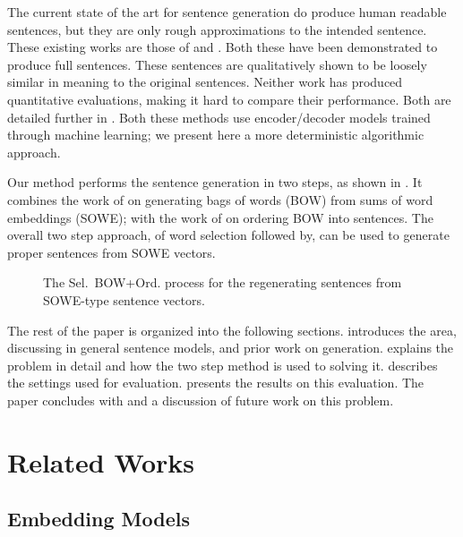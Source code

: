 \documentclass[compsoc]{IEEEtran}
\theoremstyle{plain}
\theoremstyle{definition}
\newcommand{\twosteptitle}{Sel.~BOW+Ord.}
\begin{document}
The current state of the art for sentence generation do produce human readable sentences, but they are only rough approximations to the intended sentence. These existing works are those of  \textcite{iyyer2014generating} and \textcite{Bowman2015SmoothGeneration}. Both these have been demonstrated to produce full sentences. These sentences are qualitatively shown to be loosely similar in meaning to the original sentences. Neither work has produced quantitative evaluations, making it hard to compare their performance. Both are detailed further in . Both these methods use encoder/decoder models trained through machine learning; we present here a more deterministic algorithmic approach.


Our method performs the sentence generation in two steps, as shown in . It combines the work of \textcite{White2015BOWgen} on generating bags of words (BOW) from sums of word embeddings (SOWE); with the work of \textcite{Horvat2014} on ordering BOW into sentences. The overall two step approach, of word selection followed by, can be used to generate proper sentences from SOWE vectors.

\begin{figure}
	\centering 
	
	\caption{The \twosteptitle{} process for the regenerating sentences from SOWE-type sentence vectors.}
	\label{block_diagram}
\end{figure}

The rest of the paper is organized into the following sections.  introduces the area, discussing in general sentence models, and prior work on generation.  explains the problem in detail and how the two step method is used to solving it.  describes the settings used for evaluation.  presents the results on this evaluation. The paper concludes with  and a discussion of future work on this problem.


\section{Related Works}\label{relwork}
\subsection{Embedding Models}
\end{document}
